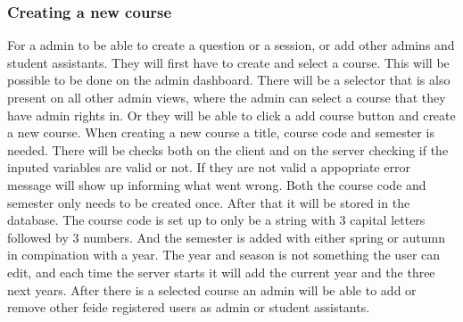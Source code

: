 \subsubsection{Creating a new course}
For a admin to be able to create a question or a session, or add other admins and student assistants. They will first have to create and select a course. This will be possible to be done on the admin dashboard. There will be a selector that is also present on all other admin views, where the admin can select a course that they have admin rights in. Or they will be able to click a add course button and create a new course. When creating a new course a title, course code and semester is needed. There will be checks both on the client and on the server checking if the inputed variables are valid or not. If they are not valid a appopriate error message will show up informing what went wrong. Both the course code and semester only needs to be created once. After that it will be stored in the database. The course code is set up to only be a string with 3 capital letters followed by 3 numbers. And the semester is added with either spring or autumn in compination with a year. The year and season is not something the user can edit, and each time the server starts it will add the current year and the three next years. After there is a selected course an admin will be able to add or remove other feide registered users as admin or student assistants.